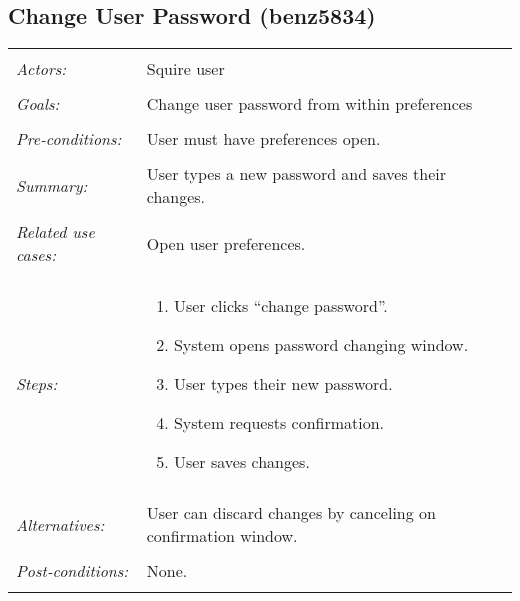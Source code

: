 \subsection{Change User Password (benz5834)}
\begin{tabular}{ p{2cm} p{12cm} }
 \hline
 \\
 \textit{Actors:} & Squire user \\ 
 \\
 \textit{Goals:} & Change user password from within preferences \\
 \\
 \textit{Pre-conditions:} & User must have preferences open. \\
 \\
 \textit{Summary:} & User types a new password and saves their changes.  \\ 
 \\
 \textit{Related use cases:} & Open user preferences. \\ 
 \\
 \textit{Steps:} & \begin{enumerate}
  \item User clicks “change password”.
  \item System opens password changing window.
  \item User types their new password.
  \item System requests confirmation.
  \item User saves changes.
 \end{enumerate} \\
 \\
 \textit{Alternatives:} & User can discard changes by canceling on confirmation window. \\
 \\
 \textit{Post-conditions:} & None. \\
 \\
\hline
\end{tabular}